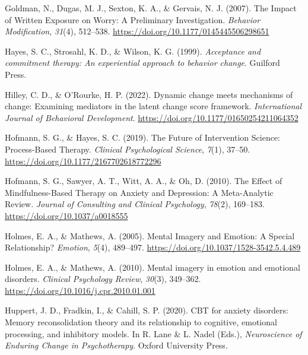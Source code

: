 \documentclass[
  man,floatsintext]{apa7}
\newlength{\cslhangindent}
\newlength{\cslentryspacingunit} %
\newenvironment{CSLReferences}[2] %
 {%
  \setlength{\parindent}{0pt}
  \ifodd #1
  \let\oldpar\par
  \def\par{\hangindent=\cslhangindent\oldpar}
  \fi
  \setlength{\parskip}{#2\cslentryspacingunit}
 }%
 {}
\begin{document}
\begin{CSLReferences}{1}{0}
\leavevmode{}%
Goldman, N., Dugas, M. J., Sexton, K. A., \& Gervais, N. J. (2007). The Impact of Written Exposure on Worry: A Preliminary Investigation. \emph{Behavior Modification}, \emph{31}(4), 512--538. \url{https://doi.org/10.1177/0145445506298651}

\leavevmode{}%
Hayes, S. C., Strosahl, K. D., \& Wilson, K. G. (1999). \emph{Acceptance and commitment therapy: An experiential approach to behavior change}. Guilford Press.

\leavevmode{}%
Hilley, C. D., \& O'Rourke, H. P. (2022). Dynamic change meets mechanisms of change: Examining mediators in the latent change score framework. \emph{International Journal of Behavioral Development}. \url{https://doi.org/10.1177/01650254211064352}

\leavevmode{}%
Hofmann, S. G., \& Hayes, S. C. (2019). The Future of Intervention Science: Process-Based Therapy. \emph{Clinical Psychological Science}, \emph{7}(1), 37--50. \url{https://doi.org/10.1177/2167702618772296}

\leavevmode{}%
Hofmann, S. G., Sawyer, A. T., Witt, A. A., \& Oh, D. (2010). The Effect of Mindfulness-Based Therapy on Anxiety and Depression: A Meta-Analytic Review. \emph{Journal of Consulting and Clinical Psychology}, \emph{78}(2), 169--183. \url{https://doi.org/10.1037/a0018555}

\leavevmode{}%
Holmes, E. A., \& Mathews, A. (2005). Mental Imagery and Emotion: A Special Relationship? \emph{Emotion}, \emph{5}(4), 489--497. \url{https://doi.org/10.1037/1528-3542.5.4.489}

\leavevmode{}%
Holmes, E. A., \& Mathews, A. (2010). Mental imagery in emotion and emotional disorders. \emph{Clinical Psychology Review}, \emph{30}(3), 349--362. \url{https://doi.org/10.1016/j.cpr.2010.01.001}

\leavevmode{}%
Huppert, J. D., Fradkin, I., \& Cahill, S. P. (2020). CBT for anxiety disorders: Memory reconsolidation theory and its relationship to cognitive, emotional processing, and inhibitory models. In R. Lane \& L. Nadel (Eds.), \emph{Neuroscience of Enduring Change in Psychotherapy}. Oxford University Press.


\end{CSLReferences}
\end{document}
